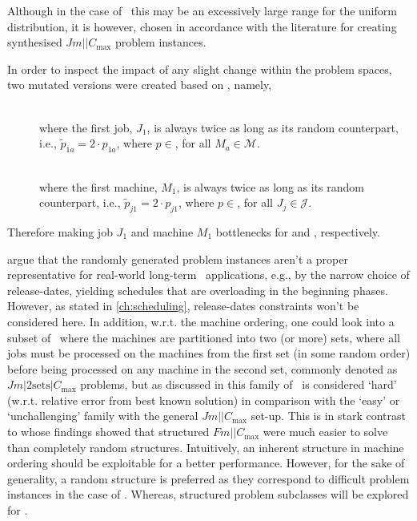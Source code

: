 Although in the case of \ this may be an excessively large range for 
the uniform distribution, it is however, chosen in accordance with the 
literature \citep{Demirkol98} for creating synthesised $Jm||C_{\max}$ problem 
instances. 

In order to inspect the impact of any slight change within the problem spaces, 
two mutated versions were created based on , namely, 
\begin{description}
	\item[\JrndJ]  \hfill \\ where the first job, $J_1$, is always twice as long as its random counterpart, i.e.,\linebreak
	$\tilde{p}_{1a}=2\cdot p_{1a}$, where $p\in$, for all $M_a\in\mathcal{M}$. 
	\item[\JrndM]  \hfill \\ where the first machine, $M_1$, is always twice as long as its random counterpart, i.e.,\linebreak
	$\tilde{p}_{j1}=2\cdot p_{j1}$, where $p\in$, for all $J_j\in\mathcal{J}$. 
\end{description}
Therefore making job $J_1$ and machine $M_1$ bottlenecks for  and 
, respectively.

\citet{Hildebrandt2010} argue that the randomly generated problem 
instances aren't a proper representative for real-world long-term \jsp\   
applications, e.g., by the narrow choice of release-dates, yielding schedules 
that are overloading in the beginning phases. However, as stated in
\cref{ch:scheduling}, release-dates constraints won't be considered here.
In addition, w.r.t. the machine ordering, one could look into a 
subset of \JSP\ where the machines are partitioned into two (or more) sets, 
where all jobs must be processed on the machines from the first set (in some 
random order) before being processed on any machine in the second set, commonly 
denoted as $Jm|2\textrm{sets}|C_{\max}$ problems, but as discussed in 
\cite{orlib_swv} this family of \JSP\ is considered `hard' (w.r.t. relative 
error from best known solution) in comparison with the `easy' or 
`unchallenging' family with the general $Jm||C_{\max}$ set-up. %
This is in stark contrast to \citet{Whitley} whose findings showed that 
structured $Fm||C_{\max}$ were much easier to solve than completely random 
structures. 
Intuitively, an inherent structure in machine ordering should be exploitable 
for a better performance.  However, for the sake of generality, a random 
structure is preferred as they correspond to difficult problem instances in the 
case of \JSP. Whereas, structured problem subclasses will be explored for 
\FSP.  

